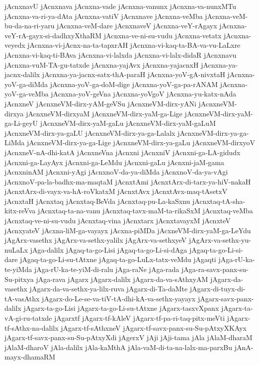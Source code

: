 {jAcnxnavU
jAcnxnava
jAcnxna-vade
jAcnxna-vanunx
jAcnxna-va-nunxMTu
jAcnxna-va-ri-ya-dAta
jAcnxna-vatiV
jAcnxnave
jAcnxna-veMba
jAcnxna-veM-bu-da-na-ri-yaru
jAcnxna-veM-dare
jAcnxnaveV
jAcnxna-veY-rAgayx
jAcnxna-veY-rA-gayx-si-dadhxyXthaRM
jAcnxna-ve-ni-su-vudu
jAcnxna-vetatx
jAcnxna-veyedx
jAcnxna-vi-jAcnx-na-ta-tapxrAH
jAcnxna-vi-kaq-ta-BA-va-vu-LaLxre
jAcnxna-vi-kaq-ti-BAva
jAcnxna-vi-lalxda
jAcnxna-vi-lalx-didaR
jAcnxnavu
jAcnxna-vuM-TA-gu-tatxde
jAcnxna-yajAvx
jAcnxna-yajacnxH
jAcnxna-ya-jacnx-dalilx
jAcnxna-ya-jacnx-satx-thA-paraH
jAcnxna-yoV-gA-nivxtaH
jAcnxna-yoV-ga-diMda
jAcnxna-yoV-ga-doM-dige
jAcnxna-yoV-ga-pa-rANAM
jAcnxna-yoV-ga-veMba
jAcnxna-yoV-geVna
jAcnxna-yoVgoV
jAcnxna-yu-katx-nAda
jAcnxneV
jAcnxneVM-dirx-yAM-geVSu
jAcnxneVM-dirx-yANi
jAcnxneVM-dirxya
jAcnxneVM-dirxyaM
jAcnxneVM-dirx-yaM-ga-Lige
jAcnxneVM-dirx-yaM-ga-Li-geyU
jAcnxneVM-dirx-yaM-gaLu
jAcnxneVM-dirx-yaM-gaLuM
jAcnxneVM-dirx-ya-gaLU
jAcnxneVM-dirx-ya-ga-Lalalx
jAcnxneVM-dirx-ya-ga-LiMda
jAcnxneVM-dirx-ya-ga-Lige
jAcnxneVM-dirx-ya-gaLu
jAcnxneVM-dirxyoV
jAcnxneV-nA-dhi-katA
jAcnxneVna
jAcnxni
jAcnxniV
jAcnxni-ga-LA-gidudx
jAcnxni-ga-LayAyx
jAcnxni-ga-LeMdu
jAcnxni-gaLu
jAcnxni-jaM-gama
jAcnxninAM
jAcnxni-yAgi
jAcnxnoV-da-ya-diMda
jAcnxnoV-da-ya-vAgi
jAcnxnoV-pa-la-badhx-ma-maqtaM
jAcnxtAmi
jAcnxtArx-di-tarx-ya-hiV-nakaH
jAcnxtArx-di-vayx-va-hA-roVkatxM
jAcnxtAvx
jAcnxtAvx-maq-tAsetxV
jAcnxtaH
jAcnxtaq
jAcnxtaq-BeVda
jAcnxtaq-pu-La-kaSxnu
jAcnxtaq-tA-sha-kitx-reVva
jAcnxtaq-ta-na-vanu
jAcnxtaq-tavx-maM-ta-rikaSxM
jAcnxtaq-veMba
jAcnxtaq-ve-ni-su-vudu
jAcnxtaq-vina
jAcnxtarx
jAcnxtavayxM
jAcnxteV
jAcnxyateV
jAcxna-liM-ga-vayayx
jAcxna-piMDa
jAcxneVM-dirx-yaM-ga-LeYdu
jAgArx-vasethx
jAgArx-va-sethx-yalilx
jAgArx-va-sethxyeV
jAgArx-va-sethx-yu-nuLaLx
jAga-dalilx
jAgaq-ta-go-Lisi
jAgaq-ta-go-Li-si-dAga
jAgaq-ta-go-Li-si-dare
jAgaq-ta-go-Li-su-tAtxne
jAgaq-ta-go-LuLx-tatx-veMdu
jAgaqti
jAga-rU-ka-te-yiMda
jAga-rU-ka-te-yiM-di-ralu
jAga-raNe
jAga-rada
jAga-ra-savx-panx-su-Su-pitxya
jAga-rava
jAgarx
jAgarx-dalilx
jAgarx-da-va-sAthxyAM
jAgarx-da-vasethx
jAgarx-da-va-sethx-ya-lilx-ruva
jAgarx-di-Ta-daMte
jAgarx-di-tuyx-di-tA-vasAthx
jAgarx-do-Le-se-va-tiV-tA-dhi-kA-va-sethx-yayayx
jAgarx-savx-panx-dalilx
jAgarx-ta-go-Lisi
jAgarx-ta-go-Li-su-tAtxne
jAgarx-tasxvXpanx
jAgarx-ta-vA-gi-ru-tatxde
jAgarxtf
jAgarx-tf-kAleV
jAgarx-tf-pa-ri-taq-pitx-meVti
jAgarx-tf-sAthx-na-dalilx
jAgarx-tf-sAthxneV
jAgarx-tf-savx-panx-su-Su-pAtxyXKAyx
jAgarx-tf-savx-panx-su-Su-pAtxyXdi
jAgerxV
jAji
jAji-tama
jAla
jAlaM-dharaM
jAlaM-dharoV
jAla-dalilx
jAla-kaMthA
jAla-vaM-di-ta-na-lalx-ma-parxBu
jAnA-mayx-dhamaRM
}
